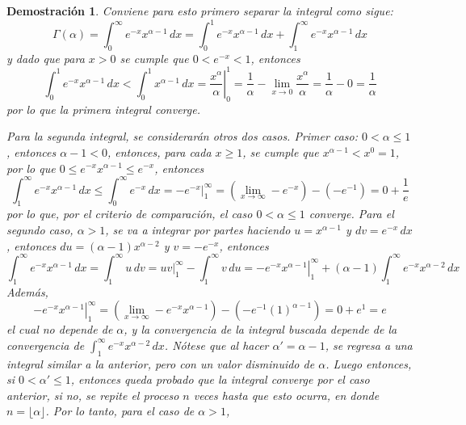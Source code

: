 \documentclass[a4paper,11pt]{article}
\theoremstyle{teoremas}
\theoremstyle{ejemplos}
\theoremstyle{definiciones}
\theoremstyle{lemas}
\newtheorem*{demostracion}{Demostraci\'on}
\begin{document}
\begin{demostracion}
 Conviene para esto primero separar la integral como sigue:
 \begin{equation*}
  \Gamma(\alpha) = \int_{0}^{\infty} e^{-x}x^{\alpha-1}\, dx = \int_{0}^{1} e^{-x}x^{\alpha-1}\, dx + \int_{1}^{\infty} e^{-x}x^{\alpha-1}\, dx
 \end{equation*}
 y dado que para $x > 0$ se cumple que $0 < e^{-x} < 1$, entonces
 \begin{equation*}
  \int_{0}^{1} e^{-x} x^{\alpha - 1}\, dx < \int_{0}^{1} x^{\alpha - 1} \, dx = \left. \frac{x^{\alpha}}{\alpha} \right|_{0}^{1} = \frac{1}{\alpha} - \lim_{x\to 0} \frac{x^{\alpha}}{\alpha} = \frac{1}{\alpha} - 0 = \frac{1}{\alpha}
 \end{equation*}
 por lo que la primera integral converge.
 \par 
 Para la segunda integral, se considerar\'an otros dos casos. Primer caso: $0 < \alpha \leq 1$, entonces $\alpha - 1 < 0$, entonces, para cada $x \geq 1$, se cumple que $x^{\alpha - 1} < x^{0} = 1$, por lo que $0 \leq e^{-x}x^{\alpha - 1} \leq e^{-x}$, entonces
 \begin{equation*}
  \int_{1}^{\infty} e^{-x} x^{\alpha - 1} \, dx \leq \int_{0}^{\infty} e^{-x}\, dx = \left. -e^{-x}  \right|_{1}^{\infty} = \left( \lim_{x\to \infty} -e^{-x} \right) - (-e^{-1}) = 0 + \frac{1}{e}
 \end{equation*}
 por lo que, por el criterio de comparaci\'on, el caso $0 < \alpha \leq 1$ converge. Para el segundo caso, $\alpha > 1$, se va a integrar por partes haciendo $u = x^{\alpha - 1}$ y $dv = e^{-x}\,dx$, entonces $du = (\alpha - 1)x^{\alpha - 2}$ y $v = - e^{-x}$, entonces
 \begin{equation*}
  \int_{1}^{\infty} e^{-x}x^{\alpha - 1} \, dx = \int_{1}^{\infty} u\, dv = uv|_{1}^{\infty} - \int_{1}^{\infty} v\, du = \left. -e^{-x}x^{\alpha-1} \right|_{1}^{\infty} + (\alpha - 1) \int_{1}^{\infty} e^{-x}x^{\alpha - 2} \, dx
 \end{equation*}
 Adem\'as,
 \begin{equation*}
  \left. -e^{-x}x^{\alpha-1} \right|_{1}^{\infty} = \left( \lim_{x \to \infty} -e^{-x}x^{\alpha-1} \right) - \left( -e^{-1}(1)^{\alpha - 1} \right) = 0 + e^1 = e
 \end{equation*}
 el cual no depende de $\alpha$, y la convergencia de la integral buscada depende de la convergencia de $\int_{1}^{\infty} e^{-x}x^{\alpha - 2}\, dx$. N\'otese que al hacer $\alpha' = \alpha - 1$, se regresa a una integral similar a la anterior, pero con un valor disminuido de $\alpha$. Luego entonces, si $0 < \alpha' \leq 1$, entonces queda probado que la integral converge por el caso anterior, si no, se repite el proceso $n$ veces hasta que esto ocurra, en donde $n = \lfloor \alpha \rfloor$. Por lo tanto, para el caso de $\alpha > 1$,

\end{demostracion}
\end{document}
